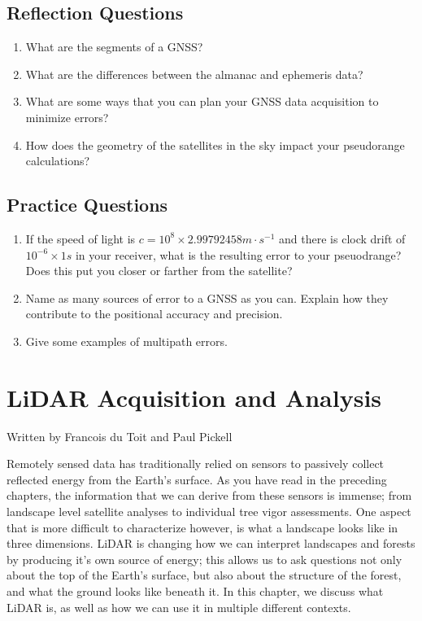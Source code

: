 \documentclass[
]{book}
\providecommand{\tightlist}{%
  \setlength{\itemsep}{0pt}\setlength{\parskip}{0pt}}
\begin{document}
\hypertarget{reflection-questions-10}{%
\section*{Reflection Questions}\label{reflection-questions-10}}

\begin{enumerate}
\def\labelenumi{\arabic{enumi}.}
\tightlist
\item
  What are the segments of a GNSS?
\item
  What are the differences between the almanac and ephemeris data?
\item
  What are some ways that you can plan your GNSS data acquisition to minimize errors?
\item
  How does the geometry of the satellites in the sky impact your pseudorange calculations?
\end{enumerate}

\hypertarget{practice-questions-6}{%
\section*{Practice Questions}\label{practice-questions-6}}

\begin{enumerate}
\def\labelenumi{\arabic{enumi}.}
\tightlist
\item
  If the speed of light is \(c = 10^{8} × 2.99792458 m·s^{-1}\) and there is clock drift of \(10^{-6} × 1 s\) in your receiver, what is the resulting error to your pseuodrange? Does this put you closer or farther from the satellite?
\item
  Name as many sources of error to a GNSS as you can. Explain how they contribute to the positional accuracy and precision.
\item
  Give some examples of multipath errors.
\end{enumerate}

\hypertarget{LiDAR-acquisition-and-analysis}{%
\chapter{LiDAR Acquisition and Analysis}\label{LiDAR-acquisition-and-analysis}}

Written by
Francois du Toit and Paul Pickell

Remotely sensed data has traditionally relied on sensors to passively collect reflected energy from the Earth's surface. As you have read in the preceding chapters, the information that we can derive from these sensors is immense; from landscape level satellite analyses to individual tree vigor assessments. One aspect that is more difficult to characterize however, is what a landscape looks like in three dimensions. LiDAR is changing how we can interpret landscapes and forests by producing it's own source of energy; this allows us to ask questions not only about the top of the Earth's surface, but also about the structure of the forest, and what the ground looks like beneath it. In this chapter, we discuss what LiDAR is, as well as how we can use it in multiple different contexts.
\end{document}
